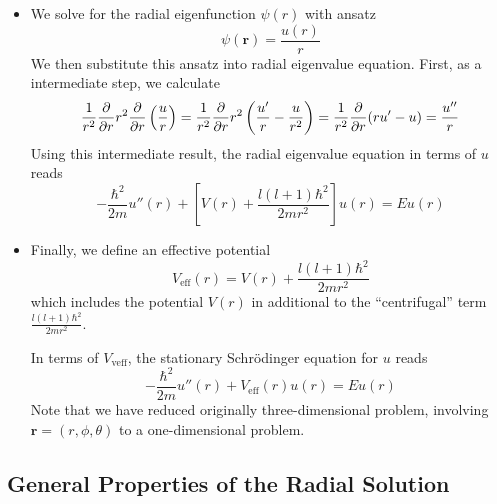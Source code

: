 \documentclass[11pt, a4paper]{article}
\newcommand{\Schro}{Schr\"{o}dinger\xspace}
\renewcommand{\vec}[1]{\bm{#1}}  %
\renewcommand{\r}{\vec{r}}  %
\newcommand{\p}{\psi}  %
\begin{document}
\begin{itemize}
	\item We solve for the radial eigenfunction $ \p(r) $ with ansatz
	\begin{equation*}
		\p(\r) = \frac{u(r)}{r}
	\end{equation*}
	We then substitute this ansatz into radial eigenvalue equation. First, as a intermediate step, we calculate
	\begin{equation*}
		\frac{1}{r^{2}}\pdv{r}r^{2}\pdv{r} \left(\frac{u}{r}\right) = \frac{1}{r^{2}}\pdv{r}r^{2}\left(\frac{u'}{r} - \frac{u}{r^{2}}\right) = \frac{1}{r^{2}}\pdv{r}(ru' - u) = \frac{u''}{r}
	\end{equation*}
	Using this intermediate result, the radial eigenvalue equation in terms of $ u $ reads
	\begin{equation*}
		-\frac{\hbar^{2}}{2m}u''(r) + \left[V(r) + \frac{l (l+1)\hbar^{2}}{2mr^{2}}\right]u(r) = Eu(r)
	\end{equation*}
	
	\item Finally, we define an effective potential 
	\begin{equation*}
		V_{\text{eff}}(r) = V(r) + \frac{l (l+1)\hbar^{2}}{2mr^{2}}
	\end{equation*}
	which includes the potential $ V(r) $ in additional to the ``centrifugal'' term $ \frac{l (l+1)\hbar^{2}}{2mr^{2}} $.
	
	
	In terms of $ V_{\text{veff}} $, the stationary \Schro equation for $ u $ reads
	\begin{equation*}
	-\frac{\hbar^{2}}{2m}u''(r) + V_{\text{eff}}(r)u(r) = Eu(r)
	\end{equation*}
	Note that we have reduced originally three-dimensional problem, involving $ \r = (r, \phi, \theta)  $ to a one-dimensional problem.
	
\end{itemize}

\subsection{General Properties of the Radial Solution}
\end{document}
